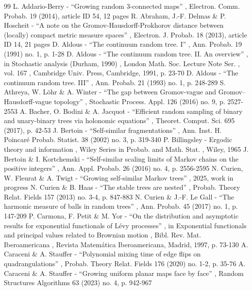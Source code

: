 \documentclass[11pt]{article}
\theoremstyle{definition}
\begin{document}
\begin{thebibliography}{99}
 L. Addario-Berry - “Growing random 3-connected maps” , Electron. Comm. Probab. 19 (2014), article ID 54, 12 pages
 R. Abraham, J.-F. Delmas \& P. Hoscheit - “A note on the Gromov-Hausdorff-Prokhorov distance between (locally) compact metric measure spaces” , Electron. J. Probab. 18 (2013), article ID 14, 21 pages
 D. Aldous - “The continuum random tree. I” , Ann. Probab. 19 (1991) no. 1, p. 1-28
 D. Aldous - “The continuum random tree. II. An overview” , in Stochastic analysis (Durham, 1990) , London Math. Soc. Lecture Note Ser. , vol. 167 , Cambridge Univ. Press, Cambridge, 1991, p. 23-70
 D. Aldous - “The continuum random tree. III” , Ann. Probab. 21 (1993) no. 1, p. 248-289
 S. Athreya, W. Löhr \& A. Winter - “The gap between Gromov-vague and Gromov–Hausdorff-vague topology” , Stochastic Process. Appl. 126 (2016) no. 9, p. 2527-2553
 A. Bacher, O. Bodini \& A. Jacquot - “Efficient random sampling of binary and unary-binary trees via holonomic equations” , Theoret. Comput. Sci. 695 (2017), p. 42-53
 J. Bertoin - “Self-similar fragmentations” , Ann. Inst. H. Poincaré Probab. Statist. 38 (2002) no. 3, p. 319-340
 P. Billingsley - Ergodic theory and information , Wiley Series in Probab. and Math. Stat. , Wiley, 1965
 J. Bertoin \& I. Kortchemski - “Self-similar scaling limits of Markov chains on the positive integers” , Ann. Appl. Probab. 26 (2016) no. 4, p. 2556-2595
 N. Curien, W. Fleurat \& A. Twigt - “Growing self-similar Markov trees” , 2025, work in progress
 N. Curien \& B. Haas - “The stable trees are nested” , Probab. Theory Relat. Fields 157 (2013) no. 3-4, p. 847-883
 N. Curien \& J.-F. Le Gall - “The harmonic measure of balls in random trees” , Ann. Probab. 45 (2017) no. 1, p. 147-209
 P. Carmona, F. Petit \& M. Yor - “On the distribution and asymptotic results for exponential functionals of Lévy processes” , in Exponential functionals and principal values related to Brownian motion , Bibl. Rev. Mat. Iberoamericana , Revista Matemática Iberoamericana, Madrid, 1997, p. 73-130
 A. Caraceni \& A. Stauffer - “Polynomial mixing time of edge flips on quadrangulations” , Probab. Theory Relat. Fields 176 (2020) no. 1-2, p. 35-76
 A. Caraceni \& A. Stauffer - “Growing uniform planar maps face by face” , Random Structures Algorithms 63 (2023) no. 4, p. 942-967

\end{thebibliography}
\end{document}
